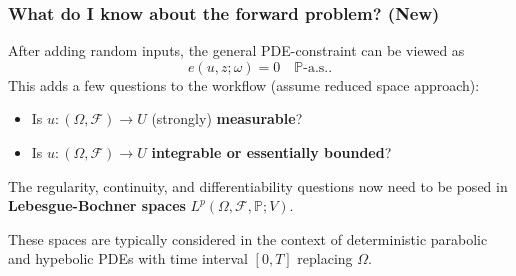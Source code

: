 \documentclass[aspectratio=169,xcolor=dvipsnames,10pt]{beamer}
\begin{document}
\begin{frame}\frametitle{What do I know about the forward problem? (New)}
\begin{block}{}
After adding random inputs, the general PDE-constraint can be viewed as 
\[
e(u,z; \omega) = 0\quad \mathbb P\text{-a.s.}.
\]
This adds a few questions to the workflow (assume reduced space approach):
\begin{itemize}
\item Is $u : (\Omega,\mathcal{F}) \to U$ (strongly) \textbf{measurable}? 
\item Is $u : (\Omega, \mathcal{F}) \to U$ \textbf{integrable or essentially bounded}?
\end{itemize}\medskip

The regularity, continuity, and differentiability questions now need to be posed in  \textbf{Lebesgue-Bochner spaces} $L^{p}(\Omega, \mathcal{F}, \mathbb P; V)$.\medskip

These spaces are typically considered in the context of deterministic parabolic and hypebolic PDEs with time interval $[0,T]$ replacing $\Omega$.
\end{block}
\end{frame}

\end{document}
